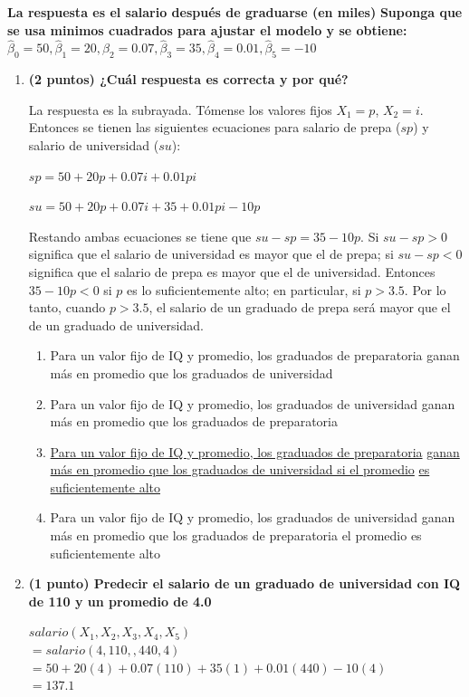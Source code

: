 \documentclass[a4paper,10pt]{article}
\begin{document}
\begin{enumerate}
 \textbf{La respuesta es el salario después de graduarse (en miles)}
  \textbf{Suponga que se usa minimos cuadrados para ajustar el modelo y se obtiene:} $\hat\beta_0=50, \hat\beta_1=20, \hat\beta_2=0.07, \hat\beta_3=35, \hat\beta_4=0.01, \hat\beta_5=-10$
  \begin{enumerate}
   \item \textbf{(2 puntos) ¿Cuál respuesta es correcta y por qué?}

La respuesta es la subrayada. Tómense los valores fijos $X_1 = p$, $X_2 = i$. Entonces se tienen las siguientes ecuaciones para salario de prepa ($sp$) y salario de universidad ($su$):

$sp = 50 + 20p + 0.07i + 0.01pi$

$su = 50 +20p + 0.07i + 35 + 0.01pi - 10p$

Restando ambas ecuaciones se tiene que $su - sp = 35 - 10p$. Si $su - sp > 0$ significa que el salario de universidad es mayor que el de prepa; si $su - sp < 0$ significa que el salario de prepa es mayor que el de universidad. Entonces $35 - 10p < 0$ si $p$ es lo suficientemente alto; en particular, si $p > 3.5$. Por lo tanto, cuando $p > 3.5$, el salario de un graduado de prepa será mayor que el de un graduado de universidad.

    \begin{enumerate}
        \item Para un valor fijo de IQ y promedio, los graduados de preparatoria ganan más en promedio que los graduados de universidad
        \item Para un valor fijo de IQ y promedio, los graduados de universidad ganan más en promedio que los graduados de preparatoria
        \item \underline{Para un valor fijo de IQ y promedio, los graduados de preparatoria} \underline{ganan más en promedio que los graduados de universidad si el promedio} \underline{es suficientemente alto}
        \item Para un valor fijo de IQ y promedio, los graduados de universidad ganan más en promedio que los graduados de preparatoria
        el promedio es suficientemente alto
    \end{enumerate}
    \item \textbf{(1 punto) Predecir el salario de un graduado de universidad con IQ de 110 y un promedio de 4.0}
    
$salario(X_1, X_2, X_3, X_4, X_5)$\\
$= salario(4, 110, , 440, 4)$\\
$= 50 + 20(4) + 0.07(110) + 35(1) + 0.01(440) - 10(4)$\\
$= 137.1$


\end{enumerate}
\end{enumerate}
\end{document}
